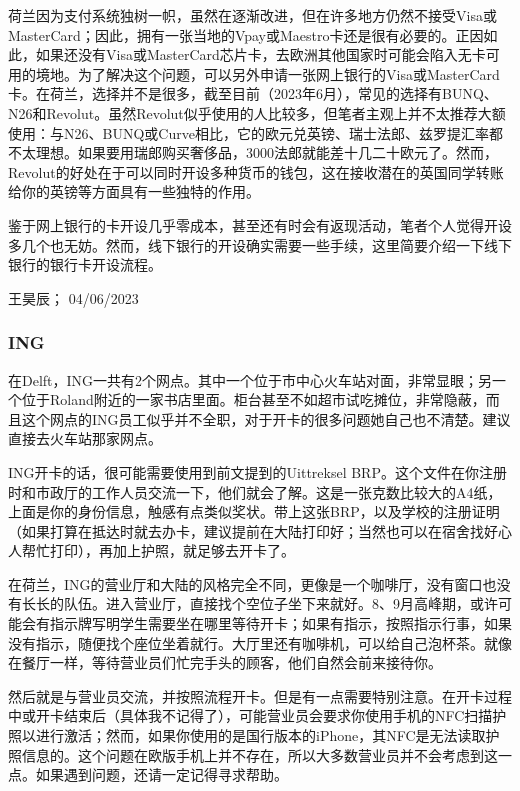 荷兰因为支付系统独树一帜，虽然在逐渐改进，但在许多地方仍然不接受Visa或MasterCard；因此，拥有一张当地的Vpay或Maestro卡还是很有必要的。正因如此，如果还没有Visa或MasterCard芯片卡，去欧洲其他国家时可能会陷入无卡可用的境地。为了解决这个问题，可以另外申请一张网上银行的Visa或MasterCard卡。在荷兰，选择并不是很多，截至目前（2023年6月），常见的选择有BUNQ、N26和Revolut。虽然Revolut似乎使用的人比较多，但笔者主观上并不太推荐大额使用：与N26、BUNQ或Curve相比，它的欧元兑英镑、瑞士法郎、兹罗提汇率都不太理想。如果要用瑞郎购买奢侈品，3000法郎就能差十几二十欧元了。然而，Revolut的好处在于可以同时开设多种货币的钱包，这在接收潜在的英国同学转账给你的英镑等方面具有一些独特的作用。

鉴于网上银行的卡开设几乎零成本，甚至还有时会有返现活动，笔者个人觉得开设多几个也无妨。然而，线下银行的开设确实需要一些手续，这里简要介绍一下线下银行的银行卡开设流程。
\begin{flushright}
王昊辰； 04/06/2023
\end{flushright}

\subsubsection{ING}
在Delft，ING一共有2个网点。其中一个位于市中心火车站对面，非常显眼；另一个位于Roland附近的一家书店里面。柜台甚至不如超市试吃摊位，非常隐蔽，而且这个网点的ING员工似乎并不全职，对于开卡的很多问题她自己也不清楚。建议直接去火车站那家网点。

ING开卡的话，很可能需要使用到前文提到的Uittreksel BRP。这个文件在你注册时和市政厅的工作人员交流一下，他们就会了解。这是一张克数比较大的A4纸，上面是你的身份信息，触感有点类似奖状。带上这张BRP，以及学校的注册证明（如果打算在抵达时就去办卡，建议提前在大陆打印好；当然也可以在宿舍找好心人帮忙打印），再加上护照，就足够去开卡了。

在荷兰，ING的营业厅和大陆的风格完全不同，更像是一个咖啡厅，没有窗口也没有长长的队伍。进入营业厅，直接找个空位子坐下来就好。8、9月高峰期，或许可能会有指示牌写明学生需要坐在哪里等待开卡；如果有指示，按照指示行事，如果没有指示，随便找个座位坐着就行。大厅里还有咖啡机，可以给自己泡杯茶。就像在餐厅一样，等待营业员们忙完手头的顾客，他们自然会前来接待你。

然后就是与营业员交流，并按照流程开卡。但是有一点需要特别注意。在开卡过程中或开卡结束后（具体我不记得了），可能营业员会要求你使用手机的NFC扫描护照以进行激活；然而，如果你使用的是国行版本的iPhone，其NFC是无法读取护照信息的。这个问题在欧版手机上并不存在，所以大多数营业员并不会考虑到这一点。如果遇到问题，还请一定记得寻求帮助。


